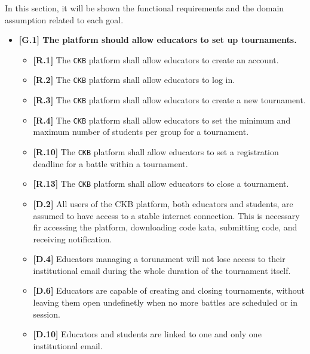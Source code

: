 In this section, it will be shown the functional requirements and the domain assumption related to each goal.
\begin{itemize}

    \item \textbf{{[G.1]} The platform should allow educators to set up tournaments.}
    \begin{itemize}
        \item \textbf{[R.1]} The \verb|CKB| platform shall allow educators to create an account.
        \item \textbf{[R.2]} The \verb|CKB| platform shall allow educators to log in.
        \item \textbf{[R.3]} The \verb|CKB| platform shall allow educators to create a new tournament. 
        \item \textbf{[R.4]} The \verb|CKB| platform shall allow educators to set the minimum and maximum number of students per group for a tournament. 
        \item \textbf{[R.10]} The \verb|CKB| platform shall allow educators to set a registration deadline for a battle within a tournament.
        \item \textbf{[R.13]} The \verb|CKB| platform shall allow educators to close a tournament.
        \item \textbf{[D.2]} All users of the CKB platform, both educators and students, are assumed to have access to a stable internet connection. This is
        necessary fir accessing the platform, downloading code kata, submitting code, and receiving notification.
        \item \textbf{[D.4]}  Educators managing a torunament will not lose access to their institutional email during the whole duration of the tournament itself.
        \item \textbf{[D.6]} Educators are capable of creating and closing tournaments, without leaving them open undefinetly when no more battles are scheduled or in session.
        \item \textbf{[D.10]} Educators and students are linked to one and only one institutional email.
    \end{itemize}


\end{itemize}
